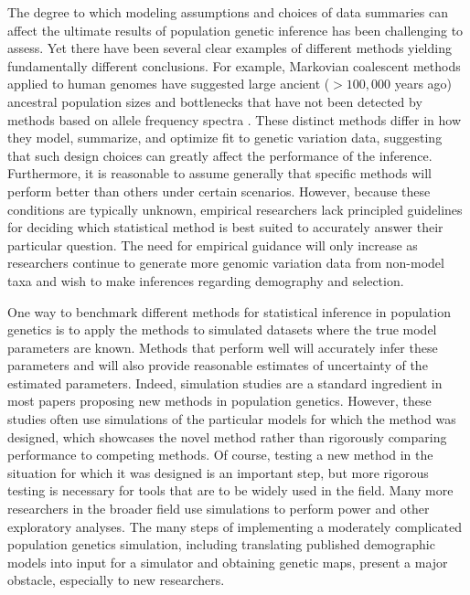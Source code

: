 \documentclass[12pt,halfline,a4paper]{ouparticle}
\begin{document}
The degree to which modeling assumptions and choices of data summaries can affect the ultimate results of population genetic inference has been challenging to assess. Yet there
have been several clear examples of different methods yielding fundamentally
different conclusions. For example, Markovian coalescent methods applied to human genomes have
suggested large ancient ($>100,000$ years ago) ancestral population sizes and
bottlenecks that have not been detected by methods based on allele frequency spectra
\citep[see][]{beichman2017comparison}.
These distinct methods differ in how they model, summarize, and optimize fit to
genetic variation data, suggesting that such design choices can greatly affect the
performance of the inference. Furthermore, it is reasonable
to assume generally that specific methods will perform better than others under certain scenarios.
However, because these conditions are typically unknown, empirical researchers
lack principled guidelines for deciding which statistical method is best suited
to accurately answer their particular question. The need for empirical
guidance will only increase as researchers continue to generate more genomic
variation data from non-model taxa and wish to make inferences regarding
demography and selection.

One way to benchmark different methods for statistical inference in population
genetics is to apply the methods to simulated datasets where the true model
parameters are known. Methods that perform well will accurately infer these
parameters and will also provide reasonable estimates of uncertainty of the
estimated parameters. Indeed, simulation studies are a standard ingredient in
most papers proposing new methods in population genetics. However, these
studies often use simulations of the particular models for which the method was designed,
which showcases the novel method rather than rigorously comparing performance to competing methods.
Of course, testing a new method in the situation for which it was designed is an important step,
but more rigorous testing is necessary for tools that are to be widely used in the field.
Many more researchers in the broader field
use simulations to perform power and other exploratory analyses.
The many steps of implementing a moderately complicated population genetics simulation,
including translating published demographic models into input for a simulator
and obtaining genetic maps,
present a major obstacle, especially to new researchers.
\end{document}

